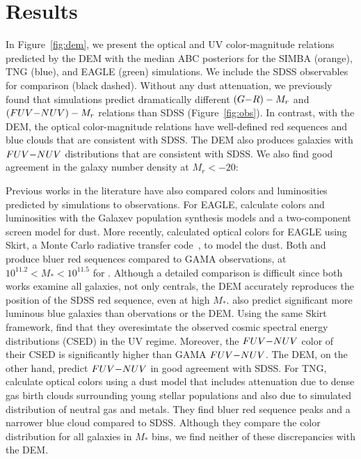 \section{Results} \label{sec:results}
In Figure~\ref{fig:dem}, we present the optical and UV color-magnitude
relations predicted by the DEM with the median ABC posteriors for the SIMBA
(orange), TNG (blue), and EAGLE (green) simulations. We include the SDSS
observables for comparison (black dashed). Without any dust attenuation, we
previously found that simulations predict dramatically different $(G{-}R) - M_r$
and $(FUV{-}NUV) - M_r$ relations than SDSS (Figure~\ref{fig:obs}). In contrast,
with the DEM, the optical color-magnitude relations have well-defined red
sequences and blue clouds that are consistent with SDSS. The DEM also produces
galaxies with $FUV{-}NUV$ distributions that are consistent with SDSS. We
also find good agreement in the galaxy number density at $M_r < -20$:

Previous works in the literature have also compared colors and luminosities
predicted by simulations to observations. For EAGLE, \cite{trayford2015}
calculate colors and luminosities with the {\sc Galaxev} population synthesis
models and a two-component screen model for dust. More recently,
\cite{trayford2017} calculated optical colors for EAGLE using {\sc Skirt}, a
Monte Carlo radiative transfer code~\citep{camps2015}, to model the dust.
Both \cite{trayford2015} and \cite{trayford2017} produce bluer red sequences
compared to GAMA observations, at $10^{11.2} < M_* < 10^{11.5}$ for 
\cite{trayford2017}. Although a detailed comparison is difficult since both works
examine all galaxies, not only centrals, the DEM accurately reproduces the 
position of the SDSS red sequence, even at high $M_*$. \cite{trayford2015} 
also predict significant more luminous blue galaxies than obervations or the DEM. 
Using the same \cite{trayford2017} {\sc Skirt} framework, \cite{baes2019} find
that they overesimtate the observed cosmic spectral energy distributions 
(CSED) in the UV regime. Moreover, the $FUV{-}NUV$ color of their CSED is
significantly higher than GAMA $FUV{-}NUV$. The DEM, on the other hand, 
predict $FUV{-}NUV$ in good agreement with SDSS. 
For TNG, \cite{nelson2018} calculate optical colors using a dust model that
includes attenuation due to dense gas birth clouds surrounding young stellar
populations and also due to simulated distribution of neutral gas and metals.
They find bluer red sequence peaks and a narrower blue cloud compared to SDSS.
Although they compare the color distribution for all galaxies in $M_*$ bins,
we find neither of these discrepancies with the DEM. 

